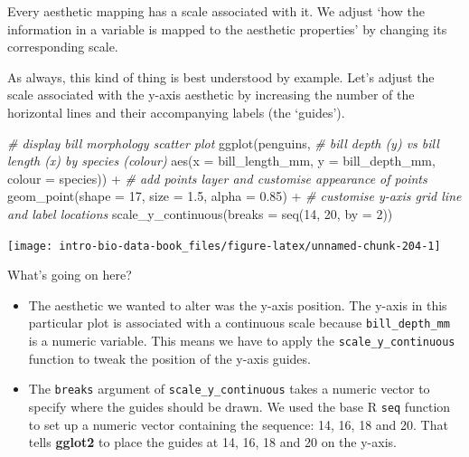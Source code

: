 \documentclass[
]{book}
\newenvironment{Shaded}{\begin{snugshade}}{\end{snugshade}}
\newcommand{\AttributeTok}[1]{\textcolor[rgb]{0.77,0.63,0.00}{#1}}
\newcommand{\CommentTok}[1]{\textcolor[rgb]{0.56,0.35,0.01}{\textit{#1}}}
\newcommand{\DecValTok}[1]{\textcolor[rgb]{0.00,0.00,0.81}{#1}}
\newcommand{\FloatTok}[1]{\textcolor[rgb]{0.00,0.00,0.81}{#1}}
\newcommand{\FunctionTok}[1]{\textcolor[rgb]{0.00,0.00,0.00}{#1}}
\newcommand{\NormalTok}[1]{#1}
\newcommand{\SpecialCharTok}[1]{\textcolor[rgb]{0.00,0.00,0.00}{#1}}
\begin{document}
Every aesthetic mapping has a scale associated with it. We adjust `how the information in a variable is mapped to the aesthetic properties' by changing its corresponding scale.

As always, this kind of thing is best understood by example. Let's adjust the scale associated with the y-axis aesthetic by increasing the number of the horizontal lines and their accompanying labels (the `guides').

\begin{Shaded}
\begin{Highlighting}[]
\CommentTok{\# display bill morphology scatter plot}
\FunctionTok{ggplot}\NormalTok{(penguins, }
       \CommentTok{\# bill depth (y) vs bill length (x) by species (colour)}
       \FunctionTok{aes}\NormalTok{(}\AttributeTok{x =}\NormalTok{ bill\_length\_mm, }\AttributeTok{y =}\NormalTok{ bill\_depth\_mm, }\AttributeTok{colour =}\NormalTok{ species)) }\SpecialCharTok{+} 
  \CommentTok{\# add points layer and customise appearance of points}
  \FunctionTok{geom\_point}\NormalTok{(}\AttributeTok{shape =} \DecValTok{17}\NormalTok{, }\AttributeTok{size =} \FloatTok{1.5}\NormalTok{, }\AttributeTok{alpha =} \FloatTok{0.85}\NormalTok{) }\SpecialCharTok{+} 
  \CommentTok{\# customise y{-}axis grid line and label locations}
  \FunctionTok{scale\_y\_continuous}\NormalTok{(}\AttributeTok{breaks =} \FunctionTok{seq}\NormalTok{(}\DecValTok{14}\NormalTok{, }\DecValTok{20}\NormalTok{, }\AttributeTok{by =} \DecValTok{2}\NormalTok{))}
\end{Highlighting}
\end{Shaded}

\begin{center}\texttt{[image: intro-bio-data-book\_files/figure-latex/unnamed-chunk-204-1]} \end{center}

What's going on here?

\begin{itemize}
\item
  The aesthetic we wanted to alter was the y-axis position. The y-axis in this particular plot is associated with a continuous scale because \texttt{bill\_depth\_mm} is a numeric variable. This means we have to apply the \texttt{scale\_y\_continuous} function to tweak the position of the y-axis guides.
\item
  The \texttt{breaks} argument of \texttt{scale\_y\_continuous} takes a numeric vector to specify where the guides should be drawn. We used the base R \texttt{seq} function to set up a numeric vector containing the sequence: 14, 16, 18 and 20. That tells \textbf{gglot2} to place the guides at 14, 16, 18 and 20 on the y-axis.
\end{itemize}
\end{document}
